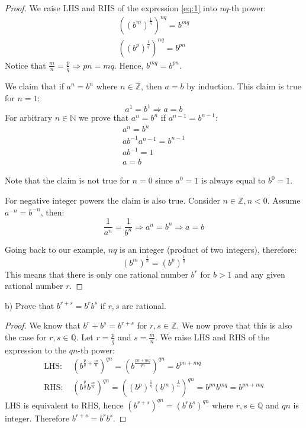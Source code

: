 \documentclass{article}
\newcommand{\N}{\mathbb{N}}
\newcommand{\Z}{\mathbb{Z}}
\newcommand{\Q}{\mathbb{Q}}
\begin{document}
\begin{proof}

We raise LHS and RHS of the expression \ref{eq:1} into $nq$-th power:
\begin{gather*}
    ((b^m)^{\frac{1}{n}})^{nq} = b^{mq} \\
    ((b^p)^{\frac{1}{q}})^{nq} = b^{pn}    
\end{gather*}
Notice that $\frac{m}{n}=\frac{p}{q} \Rightarrow pn = mq$. Hence, $b^{mq} = b^{pn}$.

We claim that if $a^n = b^n$ where $n \in \Z$, then $a=b$ by induction.
This claim is true for $n=1$:
\[ a^1 = b^1 \Rightarrow a = b \]
For arbitrary $n \in \N$ we prove that $a^n = b^n$ if $a^{n-1} = b^{n-1}$:
\begin{gather*}
    a^n = b^n \\
    ab^{-1}a^{n-1} = b^{n-1} \\
    ab^{-1} = 1 \\
    a = b
\end{gather*}

Note that the claim is not true for $n=0$ since $a^0=1$ is always equal to $b^0=1$.

For negative integer powers the claim is also true.
Consider $n \in \Z, n<0$. Assume $a^{-n} = b^{-n}$, then:
\[ \frac{1}{a^n} = \frac{1}{b^n} \Rightarrow a^n = b^n \Rightarrow a=b \]

Going back to our example, $nq$ is an integer (product of two integers), therefore:
\[ (b^m)^{\frac{1}{n}} = (b^p)^{\frac{1}{q}} \]
This means that there is only one rational number $b^r$ for $b>1$ and any given rational number $r$.

\end{proof}

\begin{tcolorbox}
b) Prove that $b^{r+s} = b^r b^s$ if $r, s$ are rational.
\end{tcolorbox}

\begin{proof}

We know that $b^r+b^s = b^{r+s}$ for $r,s \in \Z$.
We now prove that this is also the case for $r,s \in \Q$.
Let $r=\frac{p}{q}$ and $s=\frac{m}{n}$.
We raise LHS and RHS of the expression to the $qn$-th power:
\begin{align*}
    \text{LHS: } & (b^{\frac{p}{q}+\frac{m}{n}})^{qn} = (b^{\frac{pn+mq}{qn}})^{qn} = b^{pn+mq} \\
    \text{RHS: } & (b^{\frac{p}{q}}b^{\frac{m}{n}})^{qn}= ((b^p)^\frac{1}{q}(b^m)^\frac{1}{n})^{qn} = b^{pn} b^{mq} = b^{pn+mq}
\end{align*}
LHS is equivalent to RHS, hence $(b^{r+s})^{qn} = (b^r b^s)^{qn} $ where $r, s \in \Q$ and $qn$ is integer.
Therefore $b^{r+s} = b^r b^s$. 

\end{proof}
\end{document}
